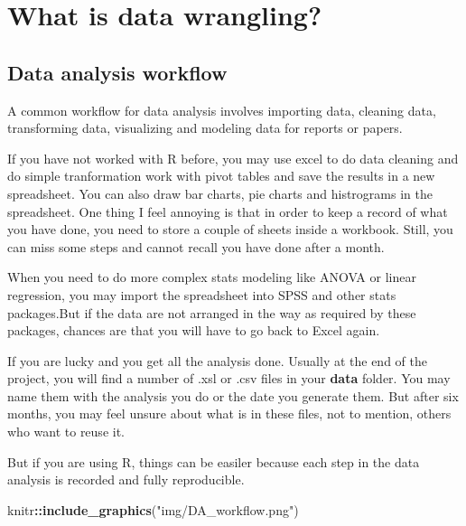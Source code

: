 \documentclass[]{book}
\newenvironment{Shaded}{\begin{snugshade}}{\end{snugshade}}
\newcommand{\KeywordTok}[1]{\textcolor[rgb]{0.13,0.29,0.53}{\textbf{#1}}}
\newcommand{\StringTok}[1]{\textcolor[rgb]{0.31,0.60,0.02}{#1}}
\newcommand{\OperatorTok}[1]{\textcolor[rgb]{0.81,0.36,0.00}{\textbf{#1}}}
\newcommand{\NormalTok}[1]{#1}
\begin{document}
\chapter{What is data wrangling?}\label{what-is-data-wrangling}

\section{Data analysis workflow}\label{data-analysis-workflow}

A common workflow for data analysis involves importing data, cleaning
data, transforming data, visualizing and modeling data for reports or
papers.

If you have not worked with R before, you may use excel to do data
cleaning and do simple tranformation work with pivot tables and save the
results in a new spreadsheet. You can also draw bar charts, pie charts
and histrograms in the spreadsheet. One thing I feel annoying is that in
order to keep a record of what you have done, you need to store a couple
of sheets inside a workbook. Still, you can miss some steps and cannot
recall you have done after a month.

When you need to do more complex stats modeling like ANOVA or linear
regression, you may import the spreadsheet into SPSS and other stats
packages.But if the data are not arranged in the way as required by
these packages, chances are that you will have to go back to Excel
again.

If you are lucky and you get all the analysis done. Usually at the end
of the project, you will find a number of .xsl or .csv files in your
\textbf{data} folder. You may name them with the analysis you do or the
date you generate them. But after six months, you may feel unsure about
what is in these files, not to mention, others who want to reuse it.

But if you are using R, things can be easiler because each step in the
data analysis is recorded and fully reproducible.

\begin{Shaded}
\begin{Highlighting}[]
\NormalTok{knitr}\OperatorTok{::}\KeywordTok{include_graphics}\NormalTok{(}\StringTok{"img/DA_workflow.png"}\NormalTok{)}
\end{Highlighting}
\end{Shaded}
\end{document}
